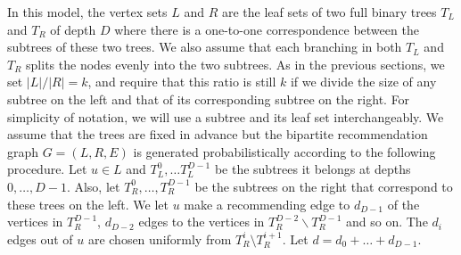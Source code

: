 In this model, the vertex sets $L$
and $R$ are the leaf sets of two full binary trees $T_L$ and $T_R$ of
depth $D$ where there is a one-to-one correspondence between the
subtrees of these two trees. We also assume that each branching in
both $T_L$ and $T_R$ splits the nodes evenly into the two
subtrees. As in the previous sections, we set $|L|/|R|=k$,
and require that this ratio is still $k$ if we divide the size of any subtree on the left
and that of its corresponding subtree on the right. For simplicity of notation, we
will use a subtree and its leaf set interchangeably. We assume that the trees are
fixed in advance but the bipartite recommendation graph $G = (L, R, E)$ is generated probabilistically according to
the following procedure. Let $u\in L$ and $T_L^0, \ldots T^{D-1}_L$ be
the subtrees it belongs at depths $0,\ldots, D-1$. Also, let
$T_R^0,\ldots, T_R^{D-1}$ be the subtrees on the right that correspond
to these trees on the left. We let $u$ make a recommending edge to $d_{D-1}$ of
the vertices in $T_{R}^{D-1}$, $d_{D-2}$ edges to the vertices in
$T_{R}^{D-2} \backslash T_{R}^{D-1}$ and so on. The $d_i$ edges out of $u$ are chosen uniformly from $T_R^i \setminus T_R^{i+1}$.
Let $d = d_{0} + \ldots + d_{D-1}$.\vs

